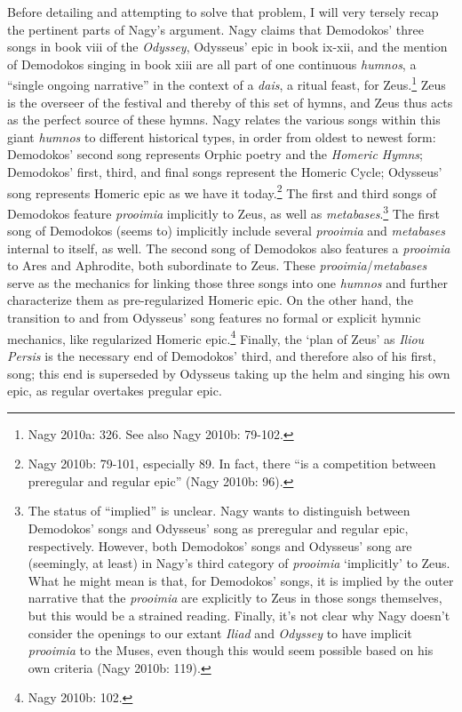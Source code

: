 \documentclass[12pt]{article}
\begin{document}
Before detailing and attempting to solve that problem, I will very tersely recap the pertinent parts of Nagy's argument. Nagy claims that Demodokos' three songs in book viii of the \textit{Odyssey}, Odysseus' epic in book ix-xii, and the mention of Demodokos singing in book xiii are all part of one continuous \textit{humnos}, a ``single ongoing narrative'' in the context of a \textit{dais}, a ritual feast, for Zeus.\footnote{ Nagy 2010a: 326. See also Nagy 2010b: 79-102.} Zeus is the overseer of the festival and thereby of this set of hymns, and Zeus thus acts as the perfect source of these hymns. Nagy relates the various songs within this giant \textit{humnos} to different historical types, in order from oldest to newest form: Demodokos' second song represents Orphic poetry and the \textit{Homeric Hymns}; Demodokos' first, third, and final songs represent the Homeric Cycle; Odysseus' song represents Homeric epic as we have it today.\footnote{ Nagy 2010b: 79-101, especially 89. In fact, there ``is a competition between preregular and regular epic'' (Nagy 2010b: 96).} The first and third songs of Demodokos feature \textit{prooimia} implicitly to Zeus, as well as \textit{metabases}.\footnote{ The status of ``implied'' is unclear. Nagy wants to distinguish between Demodokos' songs and Odysseus' song as preregular and regular epic, respectively. However, both Demodokos' songs and Odysseus' song are (seemingly, at least) in Nagy's third category of \textit{prooimia} `implicitly' to Zeus. What he might mean is that, for Demodokos' songs, it is implied by the outer narrative that the \textit{prooimia} are explicitly to Zeus in those songs themselves, but this would be a strained reading. Finally, it's not clear why Nagy doesn't consider the openings to our extant \textit{Iliad} and \textit{Odyssey} to have implicit \textit{prooimia} to the Muses, even though this would seem possible based on his own criteria (Nagy 2010b: 119).} The first song of Demodokos (seems to) implicitly include several \textit{prooimia} and \textit{metabases} internal to itself, as well. The second song of Demodokos also features a \textit{prooimia} to Ares and Aphrodite, both subordinate to Zeus. These \textit{prooimia}/\textit{metabases} serve as the mechanics for linking those three songs into one \textit{humnos} and further characterize them as pre-regularized Homeric epic. On the other hand, the transition to and from Odysseus' song features no formal or explicit hymnic mechanics, like regularized Homeric epic.\footnote{ Nagy 2010b: 102.} Finally, the `plan of Zeus' as \textit{Iliou Persis} is the necessary end of Demodokos' third, and therefore also of his first, song; this end is superseded by Odysseus taking up the helm and singing his own epic, as regular overtakes pregular epic.
\end{document}
